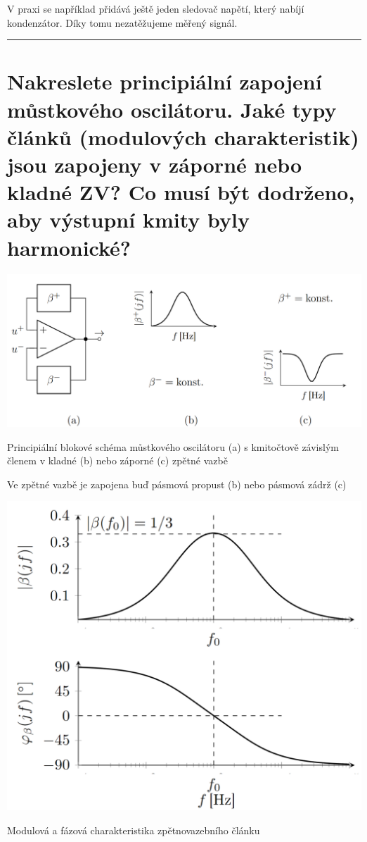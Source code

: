\documentclass[a4paper,12pt]{article}   %
\begin{document}
V praxi se například přidává ještě jeden sledovač napětí, který nabíjí kondenzátor. Díky tomu nezatěžujeme měřený signál.
\\
\hrule%













\section{Nakreslete principiální zapojení můstkového oscilátoru. Jaké typy článků (modulových charakteristik) jsou zapojeny v záporné nebo kladné ZV? Co musí být dodrženo, aby výstupní kmity byly harmonické?}
\begin{schema}[h!]
    \centering
    \includegraphics[width=.9\textwidth]{mustkovy-oscilator.PNG}
    \caption{Principiální blokové schéma můstkového oscilátoru (a) s kmitočtově závislým členem v kladné (b) nebo záporné (c) zpětné vazbě}
    \label{sch:mustkovy:oscilator}
\end{schema}

Ve zpětné vazbě je zapojena buď pásmová propust (b) nebo pásmová zádrž (c)

\begin{graf}[h!]
    \centering
    \includegraphics[width = .5\textwidth]{modulova-charakteristika-zv-clanku-oscilator.PNG}
    \caption{Modulová a fázová charakteristika zpětnovazebního článku}
    \label{graf:osc:modul:charstka}
\end{graf}
\end{document}
